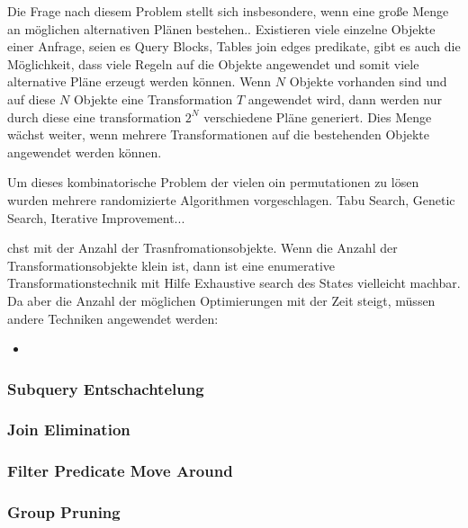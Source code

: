 Die Frage nach diesem Problem stellt sich insbesondere, wenn eine große Menge an möglichen alternativen Plänen bestehen.. Existieren viele einzelne Objekte einer Anfrage, seien es Query Blocks, Tables join edges predikate, gibt es auch die Möglichkeit, dass viele Regeln auf die Objekte angewendet und somit viele alternative Pläne erzeugt werden können. Wenn $N$ Objekte vorhanden sind und auf diese $N$ Objekte eine Transformation $T$ angewendet wird, dann werden nur durch diese eine transformation $2^N$ verschiedene Pläne generiert. Dies Menge wächst weiter, wenn mehrere Transformationen auf die bestehenden Objekte angewendet werden können. 


Um dieses kombinatorische Problem der vielen oin permutationen zu lösen wurden mehrere randomizierte Algorithmen vorgeschlagen. Tabu Search, Genetic Search, Iterative Improvement...

chst mit der Anzahl der Trasnfromationsobjekte. Wenn die Anzahl der Transformationsobjekte klein ist, dann ist eine enumerative Transformationstechnik mit Hilfe Exhaustive search des States vielleicht machbar. Da aber die Anzahl der möglichen Optimierungen mit der Zeit steigt, müssen andere Techniken angewendet werden:

\begin{itemize}
\item 
\end{itemize}

\subsubsection{Subquery Entschachtelung}

\subsubsection{Join Elimination}

\subsubsection{Filter Predicate Move Around}

\subsubsection{Group Pruning}
